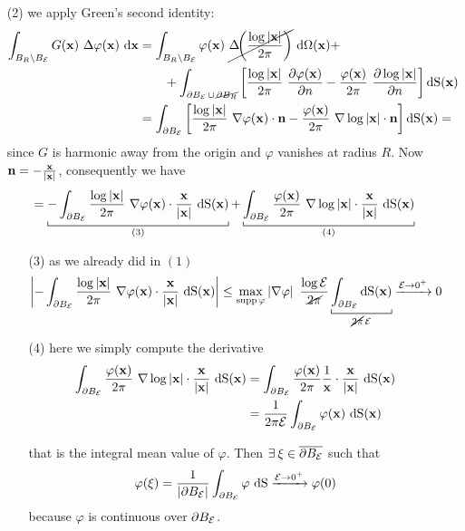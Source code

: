\begin{demo}
\begin{enumerate}
\item[(2)] we apply Green's second identity:
\begin{equation*}
\begin{aligned}
\int_{B_R\setminus{B_\Ec}} G(\xv)\ \Delta\varphi(\xv)\dxv&=\int_{B_R\setminus{B_\Ec}} \varphi(\xv)\ \cancel{\Delta\!\!\left( \frac{\log|\xv|}{2\pi}  \right)}\domxv+\\
&\qquad+\int_{\partial B_\Ec\,\cup\,\cancel{\partial B_R}} \left[ \frac{\log|\xv|}{2\pi}\ \frac{\partial\varphi(\xv)}{\partial n} -\frac{\varphi(\xv)}{2\pi}\ \frac{\partial\log|\xv|}{\partial n}\right]\!\!\dSxv\\
&=\int_{\partial B_\Ec}\left[\frac{\log|\xv|}{2\pi}\ \nabla\varphi(\xv)\cdot\nv-\frac{\varphi(\xv)}{2\pi}\ \nabla\log|\xv|\cdot \nv  \right]\!\!\dSxv =
\end{aligned}
\end{equation*}
since $G$ is harmonic away from the origin and $\varphi$ vanishes at radius $R$. Now $\mathbf{n}=-\frac{\mathbf{x}}{|\mathbf{x}|}$, consequently we have
\begin{equation*}
=\underbracket[0.5pt]{-\int_{\partial B_\Ec} \frac{\log|\xv|}{2\pi}\ \nabla\varphi(\xv)\cdot\frac{\xv}{|\xv|}\dSxv}_{(3)}+\underbracket[0.5pt]{ \int_{\partial B_\Ec} \frac{\varphi(\xv)}{2\pi}\ \nabla\log|\xv|\cdot \frac{\xv}{|\xv|} \dSxv }_{(4)}
\end{equation*}
\begin{enumerate}
\item[(3)] as we already did in $(1)$
\begin{equation*}
\left| -\int_{\partial B_\Ec} \frac{\log|\xv|}{2\pi}\ \nabla\varphi(\xv)\cdot\frac{\xv}{|\xv|}\dSxv \right| \leq \max_{\supp\varphi} \left| \nabla\varphi \right|\ \frac{\log\Ec}{\cancel{2\pi}}\underbracket[0.5pt]{\int_{\partial B_\Ec}\!\! \dSxv}_{\cancel{2\pi}\,\Ec} \xrightarrow{\Ec\to0^+}0
\end{equation*}
\item[(4)] here we simply compute the derivative
\begin{align*}
\int_{\partial B_{\mathcal{E}}} \frac{\varphi(\mathbf{x})}{2\pi}\ \nabla\log|\mathbf{x}|\cdot \frac{\mathbf{x}}{|\mathbf{x}|} \  \mathrm{d} \mathrm{S}(\mathbf{x})&=\int_{\partial B_{\mathcal{E}}} \frac{\varphi(\mathbf{x})}{2\pi} \frac{1}{\mathbf{x}}\cdot\frac{\mathbf{x}}{|\mathbf{x}|}\  \mathrm{d} \mathrm{S}(\mathbf{x})\\
&=\frac{1}{2\pi\mathcal{E}}\int_{\partial B_{\mathcal{E}}}\varphi(\mathbf{x})\  \mathrm{d} \mathrm{S}(\mathbf{x}) 
\end{align*}

that is the integral mean value of $\varphi$. Then $\exists\xi\in\overline{\partial B_\Ec}$ such that
\begin{equation*}
\varphi(\xi)=\frac{1}{\left| \partial B_{\mathcal{E}} \right|} \int_{\partial B_{\mathcal{E}}} \varphi \  \mathrm{d} \mathrm{S} \xrightarrow{\mathcal{E}\to0^+} \varphi(0)
\end{equation*}
because $\varphi$ is continuous over $\partial B_{\mathcal{E}}$.
\end{enumerate}
\end{enumerate}


\end{demo}
